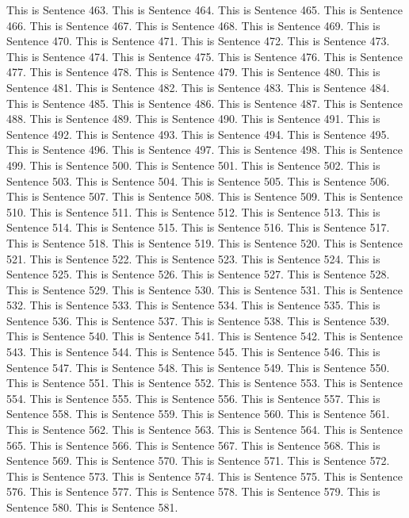 \documentclass{article}
\begin{document}
This is Sentence 463.
This is Sentence 464.
This is Sentence 465.
This is Sentence 466.
This is Sentence 467.
This is Sentence 468.
This is Sentence 469.
This is Sentence 470.
This is Sentence 471.
This is Sentence 472.
This is Sentence 473.
This is Sentence 474.
This is Sentence 475.
This is Sentence 476.
This is Sentence 477.
This is Sentence 478.
This is Sentence 479.
This is Sentence 480.
This is Sentence 481.
This is Sentence 482.
This is Sentence 483.
This is Sentence 484.
This is Sentence 485.
This is Sentence 486.
This is Sentence 487.
This is Sentence 488.
This is Sentence 489.
This is Sentence 490.
This is Sentence 491.
This is Sentence 492.
This is Sentence 493.
This is Sentence 494.
This is Sentence 495.
This is Sentence 496.
This is Sentence 497.
This is Sentence 498.
This is Sentence 499.
This is Sentence 500.
This is Sentence 501.
This is Sentence 502.
This is Sentence 503.
This is Sentence 504.
This is Sentence 505.
This is Sentence 506.
This is Sentence 507.
This is Sentence 508.
This is Sentence 509.
This is Sentence 510.
This is Sentence 511.
This is Sentence 512.
This is Sentence 513.
This is Sentence 514.
This is Sentence 515.
This is Sentence 516.
This is Sentence 517.
This is Sentence 518.
This is Sentence 519.
This is Sentence 520.
This is Sentence 521.
This is Sentence 522.
This is Sentence 523.
This is Sentence 524.
This is Sentence 525.
This is Sentence 526.
This is Sentence 527.
This is Sentence 528.
This is Sentence 529.
This is Sentence 530.
This is Sentence 531.
This is Sentence 532.
This is Sentence 533.
This is Sentence 534.
This is Sentence 535.
This is Sentence 536.
This is Sentence 537.
This is Sentence 538.
This is Sentence 539.
This is Sentence 540.
This is Sentence 541.
This is Sentence 542.
This is Sentence 543.
This is Sentence 544.
This is Sentence 545.
This is Sentence 546.
This is Sentence 547.
This is Sentence 548.
This is Sentence 549.
This is Sentence 550.
This is Sentence 551.
This is Sentence 552.
This is Sentence 553.
This is Sentence 554.
This is Sentence 555.
This is Sentence 556.
This is Sentence 557.
This is Sentence 558.
This is Sentence 559.
This is Sentence 560.
This is Sentence 561.
This is Sentence 562.
This is Sentence 563.
This is Sentence 564.
This is Sentence 565.
This is Sentence 566.
This is Sentence 567.
This is Sentence 568.
This is Sentence 569.
This is Sentence 570.
This is Sentence 571.
This is Sentence 572.
This is Sentence 573.
This is Sentence 574.
This is Sentence 575.
This is Sentence 576.
This is Sentence 577.
This is Sentence 578.
This is Sentence 579.
This is Sentence 580.
This is Sentence 581.
\end{document}
